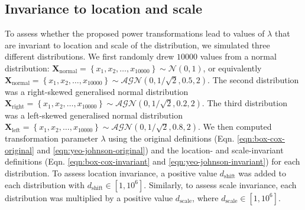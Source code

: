 \documentclass[
  a4paper,
]{article}
\begin{document}
\subsection{Invariance to location and
scale}\label{invariance-to-location-and-scale}

To assess whether the proposed power transformations lead to values of
\(\lambda\) that are invariant to location and scale of the
distribution, we simulated three different distributions. We first
randomly drew \(10000\) values from a normal distribution:
\(\mathbf{X}_{\text{normal}} = \left\{x_1, x_2, \ldots, x_{10000} \right\} \sim \mathcal{N}\left(0, 1\right)\),
or equivalently
\(\mathbf{X}_{\text{normal}} = \left\{x_1, x_2, \ldots, x_{10000} \right\} \sim \mathcal{AGN}\left(0, 1/\sqrt{2}, 0.5, 2\right)\).
The second distribution was a right-skewed generalised normal
distribution
\(\mathbf{X}_{\text{right}} = \left\{x_1, x_2, \ldots, x_{10000} \right\} \sim \mathcal{AGN}\left(0, 1/\sqrt{2}, 0.2, 2\right)\).
The third distribution was a left-skewed generalised normal distribution
\(\mathbf{X}_{\text{left}} = \left\{x_1, x_2, \ldots, x_{10000} \right\} \sim \mathcal{AGN}\left(0, 1/\sqrt{2}, 0.8, 2\right)\).
We then computed transformation parameter \(\lambda\) using the original
definitions (Eqn. \ref{eqn:box-cox-original} and
\ref{eqn:yeo-johnson-original}) and the location- and scale-invariant
definitions (Eqn. \ref{eqn:box-cox-invariant} and
\ref{eqn:yeo-johnson-invariant}) for each distribution. To assess
location invariance, a positive value \(d_{\text{shift}}\) was added to
each distribution with \(d_{\text{shift}} \in [1, 10^6]\). Similarly, to
assess scale invariance, each distribution was multiplied by a positive
value \(d_{\text{scale}}\), where \(d_{\text{scale}} \in [1, 10^6]\).
\end{document}
